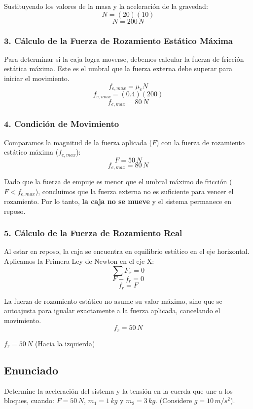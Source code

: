 \documentclass[12pt, a4paper]{article}
\begin{document}
Sustituyendo los valores de la masa y la aceleración de la gravedad:
$$ N = (20)(10) $$
$$ N = 200 \, \si{N} $$

\subsubsection*{3. Cálculo de la Fuerza de Rozamiento Estático Máxima}
Para determinar si la caja logra moverse, debemos calcular la fuerza de fricción estática máxima. Este es el umbral que la fuerza externa debe superar para iniciar el movimiento.
$$ f_{e,max} = \mu_e N $$
$$ f_{e,max} = (0.4)(200) $$
$$ f_{e,max} = 80 \, \si{N} $$

\subsubsection*{4. Condición de Movimiento}
Comparamos la magnitud de la fuerza aplicada ($F$) con la fuerza de rozamiento estático máxima ($f_{e,max}$):
$$ F = 50 \, \si{N} $$
$$ f_{e,max} = 80 \, \si{N} $$

Dado que la fuerza de empuje es menor que el umbral máximo de fricción ($F < f_{e,max}$), concluimos que la fuerza externa no es suficiente para vencer el rozamiento. Por lo tanto, \textbf{la caja no se mueve} y el sistema permanece en reposo.

\subsubsection*{5. Cálculo de la Fuerza de Rozamiento Real}
Al estar en reposo, la caja se encuentra en equilibrio estático en el eje horizontal. Aplicamos la Primera Ley de Newton en el eje X:
$$ \sum F_x = 0 $$
$$ F - f_r = 0 $$
$$ f_r = F $$

La fuerza de rozamiento estático no asume su valor máximo, sino que se autoajusta para igualar exactamente a la fuerza aplicada, cancelando el movimiento.
$$ f_r = 50 \, \si{N} $$

\begin{tcolorbox}[colback=green!5!white, colframe=green!50!black, title=Respuesta Final]
\centering \Large $f_r = 50 \, \si{N}$ (Hacia la izquierda)
\end{tcolorbox}

\newpage

\subsection*{Enunciado}
Determine la aceleración del sistema y la tensión en la cuerda que une a los bloques, cuando: $F = 50 \, \si{N}$, $m_1 = 1 \, \si{kg}$ y $m_2 = 3 \, \si{kg}$. (Considere $g = 10 \, \si{m/s^2}$).
\end{document}
